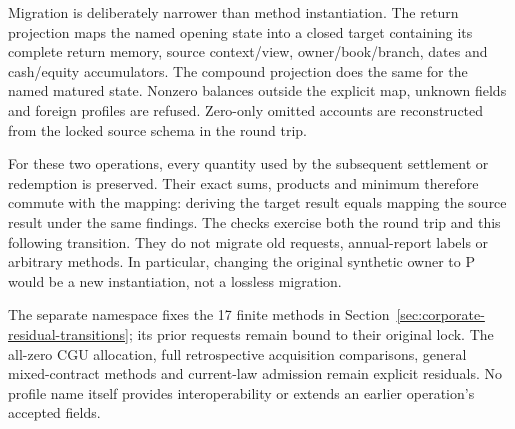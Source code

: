 Migration is deliberately narrower than method instantiation. The return
projection maps the named  opening state into a
closed target containing its complete return memory, source context/view,
owner/book/branch, dates and cash/equity accumulators. The compound projection
does the same for the named matured  state.
Nonzero balances outside the explicit map, unknown fields and foreign profiles
are refused. Zero-only omitted accounts are reconstructed from the locked
source schema in the round trip.

For these two operations, every quantity used by the subsequent settlement or
redemption is preserved. Their exact sums, products and minimum therefore
commute with the mapping: deriving the target result equals mapping the source
result under the same findings. The checks exercise both the round trip and
this following transition. They do not migrate old requests, annual-report
labels or arbitrary methods. In particular, changing the original synthetic
owner to P would be a new instantiation, not a lossless migration.

The separate  namespace fixes the 17 finite methods
in Section~\ref{sec:corporate-residual-transitions}; its prior 
requests remain bound to their original lock. The all-zero CGU allocation,
full retrospective acquisition comparisons, general mixed-contract methods
and current-law admission remain explicit residuals. No profile name itself
provides interoperability or extends an earlier operation's accepted fields.
